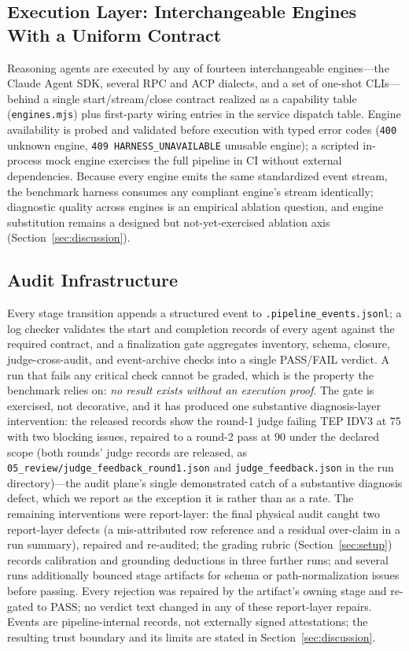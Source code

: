 \documentclass[preprint,10pt]{elsarticle}
\begin{document}
\subsection{Execution Layer: Interchangeable Engines With a Uniform Contract}
Reasoning agents are executed by any of fourteen interchangeable engines---the Claude Agent SDK, several RPC and ACP dialects, and a set of one-shot CLIs---behind a single start/stream/close contract realized as a capability table (\texttt{engines.mjs}) plus first-party wiring entries in the service dispatch table. Engine availability is probed and validated before execution with typed error codes (\texttt{400} unknown engine, \texttt{409 HARNESS\_UNAVAILABLE} unusable engine); a scripted in-process mock engine exercises the full pipeline in CI without external dependencies. Because every engine emits the same standardized event stream, the benchmark harness consumes any compliant engine's stream identically; diagnostic quality across engines is an empirical ablation question, and engine substitution remains a designed but not-yet-exercised ablation axis (Section~\ref{sec:discussion}).

\subsection{Audit Infrastructure}
Every stage transition appends a structured event to \texttt{.pipeline\_\allowbreak events.\allowbreak jsonl}; a log checker validates the start and completion records of every agent against the required contract, and a finalization gate aggregates inventory, schema, closure, judge-cross-audit, and event-archive checks into a single PASS/FAIL verdict. A run that fails any critical check cannot be graded, which is the property the benchmark relies on: \emph{no result exists without an execution proof}. The gate is exercised, not decorative, and it has produced one substantive diagnosis-layer intervention: the released records show the round-1 judge failing TEP IDV3 at 75 with two blocking issues, repaired to a round-2 pass at 90 under the declared scope (both rounds' judge records are released, as \texttt{05\_review/judge\_feedback\_round1.json} and \texttt{judge\_feedback.json} in the run directory)---the audit plane's single demonstrated catch of a substantive diagnosis defect, which we report as the exception it is rather than as a rate. The remaining interventions were report-layer: the final physical audit caught two report-layer defects (a mis-attributed row reference and a residual over-claim in a run summary), repaired and re-audited; the grading rubric (Section~\ref{sec:setup}) records calibration and grounding deductions in three further runs; and several runs additionally bounced stage artifacts for schema or path-normalization issues before passing. Every rejection was repaired by the artifact's owning stage and re-gated to PASS; no verdict text changed in any of these report-layer repairs. Events are pipeline-internal records, not externally signed attestations; the resulting trust boundary and its limits are stated in Section~\ref{sec:discussion}.
\end{document}
